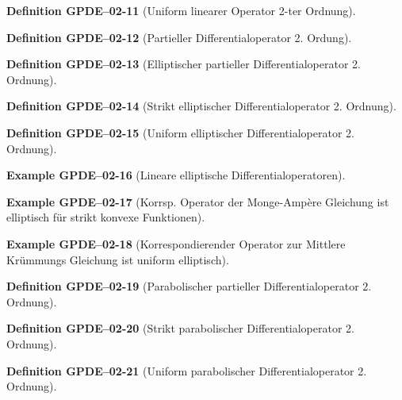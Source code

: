 \documentclass[10pt, letterpaper]{article}
\newcommand{\CustomHeading}[3]{%
  \par\medskip\noindent%
  \textbf{#1 #2} \textnormal{(#3)}.\enskip%
}
\newenvironment{DEF}[2]{\CustomHeading{Definition}{#1}{#2}}{}
\newenvironment{EXA}[2]{\CustomHeading{Example}{#1}{#2}}{}
\begin{document}
\begin{DEF}{GPDE--02-11}{Uniform linearer Operator 2-ter Ordnung}
\end{DEF}

\begin{DEF}{GPDE--02-12}{Partieller Differentialoperator 2. Ordung}
\end{DEF}

\begin{DEF}{GPDE--02-13}{Elliptischer partieller Differentialoperator 2. Ordnung}
\end{DEF}

\begin{DEF}{GPDE--02-14}{Strikt elliptischer Differentialoperator 2. Ordnung}
\end{DEF}

\begin{DEF}{GPDE--02-15}{Uniform elliptischer Differentialoperator 2. Ordnung}
\end{DEF}

\begin{EXA}{GPDE--02-16}{Lineare elliptische Differentialoperatoren}
\end{EXA}

\begin{EXA}{GPDE--02-17}{Korrsp. Operator der Monge-Ampère Gleichung ist elliptisch für strikt konvexe Funktionen}
\end{EXA}

\begin{EXA}{GPDE--02-18}{Korrespondierender Operator zur Mittlere Krümmungs Gleichung ist uniform elliptisch}
\end{EXA}

\begin{DEF}{GPDE--02-19}{Parabolischer partieller Differentialoperator 2. Ordnung}
\end{DEF}

\begin{DEF}{GPDE--02-20}{Strikt parabolischer Differentialoperator 2. Ordnung}
\end{DEF}

\begin{DEF}{GPDE--02-21}{Uniform parabolischer Differentialoperator 2. Ordnung}
\end{DEF}
\end{document}
